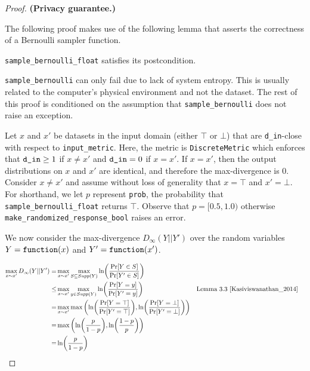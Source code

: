 \documentclass{article}
\begin{document}
\begin{proof} 
\textbf{(Privacy guarantee.)} 

\begin{tcolorbox}
\begin{note}
    The following proof makes use of the following lemma that asserts the correctness of a Bernoulli sampler function.
    \begin{lemma}
        \texttt{sample\_bernoulli\_float} satisfies its postcondition.
    \end{lemma}
\end{note}
\end{tcolorbox}

\texttt{sample\_bernoulli} can only fail due to lack of system entropy. 
This is usually related to the computer's physical environment and not the dataset. 
The rest of this proof is conditioned on the assumption that \texttt{sample\_bernoulli} does not raise an exception. 

Let $x$ and $x'$ be datasets in the input domain (either $\top$ or $\bot$) that are \texttt{d\_in}-close with respect to \texttt{input\_metric}.
Here, the metric is \texttt{DiscreteMetric} which enforces that $\texttt{d\_in} \geq 1$ if $x \ne x'$ and $\texttt{d\_in} = 0$ if $x = x'$. 
If $x = x'$, then the output distributions on $x$ and $x'$ are identical, and therefore the max-divergence is 0.
Consider $x \ne x'$ and assume without loss of generality that $x = \top$ and $x' = \bot$. 
For shorthand, we let $p$ represent \texttt{prob}, the probability that \texttt{sample\_bernoulli\_float} returns $\top$. 
Observe that $p = [0.5, 1.0)$ otherwise \texttt{make\_randomized\_response\_bool} raises an error. 

We now consider the max-divergence $D_{\infty}(Y||Y')$ over the random variables $Y = \texttt{function}(x)$ and $Y' = \texttt{function}(x')$.

\begin{align*}
    \max_{x \sim x'} D_{\infty}(Y||Y')
    =& \max_{x \sim x'} \max_{S \subseteq Supp(Y)}\ln (\frac{\Pr[Y \in S]}{\Pr[Y' \in S]}) \\
    \le& \max_{x \sim x'} \max_{y \in Supp(Y)}\ln (\frac{\Pr[Y = y]}{\Pr[Y' = y]}) &&\text{Lemma 3.3 } \cite{Kasiviswanathan_2014} \\
    =& \max_{x \sim x'} \max\left(\ln (\frac{\Pr[Y = \top]}{\Pr[Y' = \top]}), \ln(\frac{\Pr[Y = \bot]}{\Pr[Y' = \bot]})\right) \\
    =& \max\left(\ln (\frac{p}{1 - p}), \ln(\frac{1 - p}{p})\right) \\
    =& \ln (\frac{p}{1 - p})
\end{align*}


\end{proof}
\end{document}
